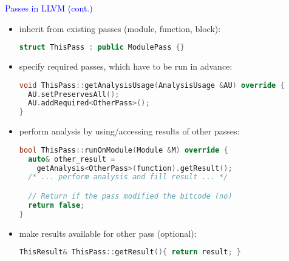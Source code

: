 \begin{frame}[fragile]{\textcolor{blue}{Passes in LLVM (cont.)}}
\underline{}
\begin{itemize}
\item inherit from existing passes (module, function, block):
\begin{footnotesize}
\begin{lstlisting}[language=C++]
struct ThisPass : public ModulePass {}
\end{lstlisting}
\end{footnotesize}

\item specify required passes, which have to be run in advance:
\begin{footnotesize}
\begin{lstlisting}[language=C++]
void ThisPass::getAnalysisUsage(AnalysisUsage &AU) override {
  AU.setPreservesAll();
  AU.addRequired<OtherPass>();
}
\end{lstlisting}
\end{footnotesize}

\item perform analysis by using/accessing results of other passes:
\begin{footnotesize}
\begin{lstlisting}[language=C++]
bool ThisPass::runOnModule(Module &M) override {
  auto& other_result =
    getAnalysis<OtherPass>(function).getResult();
  /* ... perform analysis and fill result ... */

  // Return if the pass modified the bitcode (no)
  return false;
}
\end{lstlisting}
\end{footnotesize}

\item make results available for other pass (optional):
\begin{footnotesize}
\begin{lstlisting}[language=C++]
ThisResult& ThisPass::getResult(){ return result; }
\end{lstlisting}
\end{footnotesize}

\end{itemize}

\end{frame}
%



